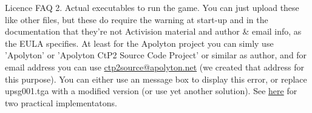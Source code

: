 \begin{section}{Licence FAQ}
{2. Actual executables to run the game. You can just upload these like other files, but these do require the warning at start-up and in the documentation that they're not Activision material and author \& email info, as the EULA specifies. At least for the Apolyton project you can simly use 'Apolyton' or 'Apolyton CtP2 Source Code Project' or similar as author, and for email address you can use \href{mailto:ctp2source@apolyton.net}{ctp2source@apolyton.net} (we created that address for this purpose). You can either use an message box to display this error, or replace upsg001.tga with a modified version (or use yet another solution). See \href{http://apolyton.net/forums/showthread.php?postid=2463088\#post2463088}{here} for two practical implementatons.
}
\end{section}%


